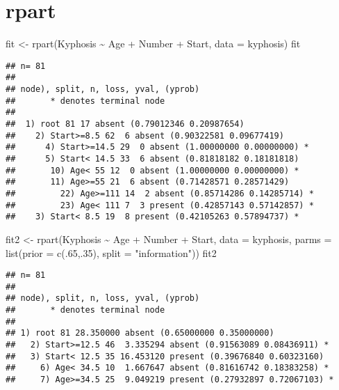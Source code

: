 \documentclass[
]{book}
\newenvironment{Shaded}{\begin{snugshade}}{\end{snugshade}}
\newcommand{\AttributeTok}[1]{\textcolor[rgb]{0.77,0.63,0.00}{#1}}
\newcommand{\DecValTok}[1]{\textcolor[rgb]{0.00,0.00,0.81}{#1}}
\newcommand{\FunctionTok}[1]{\textcolor[rgb]{0.00,0.00,0.00}{#1}}
\newcommand{\NormalTok}[1]{#1}
\newcommand{\OtherTok}[1]{\textcolor[rgb]{0.56,0.35,0.01}{#1}}
\newcommand{\SpecialCharTok}[1]{\textcolor[rgb]{0.00,0.00,0.00}{#1}}
\newcommand{\StringTok}[1]{\textcolor[rgb]{0.31,0.60,0.02}{#1}}
\begin{document}
\hypertarget{rpart}{%
\section{rpart}\label{rpart}}

\begin{Shaded}
\begin{Highlighting}[]
\NormalTok{fit }\OtherTok{\textless{}{-}} \FunctionTok{rpart}\NormalTok{(Kyphosis }\SpecialCharTok{\textasciitilde{}}\NormalTok{ Age }\SpecialCharTok{+}\NormalTok{ Number }\SpecialCharTok{+}\NormalTok{ Start, }\AttributeTok{data =}\NormalTok{ kyphosis)}
\NormalTok{fit}
\end{Highlighting}
\end{Shaded}

\begin{verbatim}
## n= 81 
## 
## node), split, n, loss, yval, (yprob)
##       * denotes terminal node
## 
##  1) root 81 17 absent (0.79012346 0.20987654)  
##    2) Start>=8.5 62  6 absent (0.90322581 0.09677419)  
##      4) Start>=14.5 29  0 absent (1.00000000 0.00000000) *
##      5) Start< 14.5 33  6 absent (0.81818182 0.18181818)  
##       10) Age< 55 12  0 absent (1.00000000 0.00000000) *
##       11) Age>=55 21  6 absent (0.71428571 0.28571429)  
##         22) Age>=111 14  2 absent (0.85714286 0.14285714) *
##         23) Age< 111 7  3 present (0.42857143 0.57142857) *
##    3) Start< 8.5 19  8 present (0.42105263 0.57894737) *
\end{verbatim}

\begin{Shaded}
\begin{Highlighting}[]
\NormalTok{fit2 }\OtherTok{\textless{}{-}} \FunctionTok{rpart}\NormalTok{(Kyphosis }\SpecialCharTok{\textasciitilde{}}\NormalTok{ Age }\SpecialCharTok{+}\NormalTok{ Number }\SpecialCharTok{+}\NormalTok{ Start, }\AttributeTok{data =}\NormalTok{ kyphosis,}
              \AttributeTok{parms =} \FunctionTok{list}\NormalTok{(}\AttributeTok{prior =} \FunctionTok{c}\NormalTok{(.}\DecValTok{65}\NormalTok{,.}\DecValTok{35}\NormalTok{), }\AttributeTok{split =} \StringTok{"information"}\NormalTok{))}
\NormalTok{fit2}
\end{Highlighting}
\end{Shaded}

\begin{verbatim}
## n= 81 
## 
## node), split, n, loss, yval, (yprob)
##       * denotes terminal node
## 
## 1) root 81 28.350000 absent (0.65000000 0.35000000)  
##   2) Start>=12.5 46  3.335294 absent (0.91563089 0.08436911) *
##   3) Start< 12.5 35 16.453120 present (0.39676840 0.60323160)  
##     6) Age< 34.5 10  1.667647 absent (0.81616742 0.18383258) *
##     7) Age>=34.5 25  9.049219 present (0.27932897 0.72067103) *
\end{verbatim}
\end{document}
